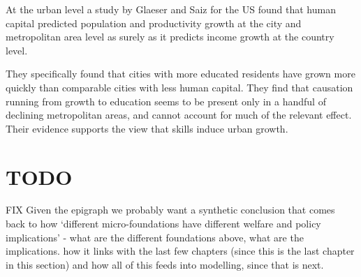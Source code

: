 At the urban level a study by Glaeser and Saiz \cite{glaeserRiseSkilledCity2003} for the US found that human capital predicted population and productivity growth at the city and metropolitan area level as surely as it predicts income growth at the country level. 

They specifically found that cities with more educated residents have grown more quickly than comparable cities with less human capital. They find that causation running from growth to education seems to be present only in a handful of declining metropolitan areas, and cannot account for much of the relevant effect. Their evidence supports the view that skills induce urban growth.


\section{TODO}
FIX
Given the epigraph we probably want a synthetic conclusion that comes back to how `different micro-foundations have different welfare and policy implications' - what are the different foundations above, what are the implications. how it links with the last few chapters (since this is the last chapter in this section) and how all of this feeds into modelling, since that is next.

